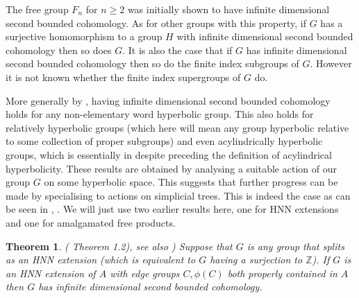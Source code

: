 \documentclass[11pt,reqno]{amsart}
\numberwithin{equation}{section}
\newcommand{\Z}{\mathbb{Z}}
\newtheorem{thm}{Theorem}[section]
\theoremstyle{definition}
\theoremstyle{remark}
\begin{document}
The free group $F_n$ for $n\geq 2$ was initially shown to have infinite
dimensional second bounded cohomology.
As for other groups with this
property, if $G$ has a surjective homomorphism to a group $H$ with infinite
dimensional second bounded cohomology then so does $G$.
It is also the case that if $G$ has infinite dimensional second
bounded cohomology then so do the finite index subgroups of $G$.
However it is not known whether the finite index supergroups of $G$ do.


More generally
by \cite{epfuj}, having infinite dimensional second bounded cohomology
holds for any non-elementary word hyperbolic group. This also holds for
relatively hyperbolic groups (which here will mean any group hyperbolic
relative to some collection of proper subgroups) and even
acylindrically hyperbolic groups, which is essentially in \cite{bstfgn}
despite preceding the definition of acylindrical hyperbolicity. These
results are obtained by analysing a suitable action of our group $G$
on some hyperbolic space. This suggests that further progress can be
made by specialising to actions on simplicial trees. This is indeed
the case as can be seen in \cite{sstocan}, \cite{hffmstrs}. We will just
use two earlier results here, one for HNN extensions and one for amalgamated
free products.
\begin{thm} (\cite{kj2} Theorem 1.2), see also \cite{grig})
\label{kj2hnn}
  Suppose that $G$ is any group that splits as an HNN extension
  (which is equivalent to $G$ having a surjection to $\Z$). If $G$ is
  an HNN extension of $A$ with edge groups $C, \phi(C)$ both
  properly contained in $A$ then $G$
  has infinite dimensional second bounded cohomology.
\end{thm}
\end{document}
